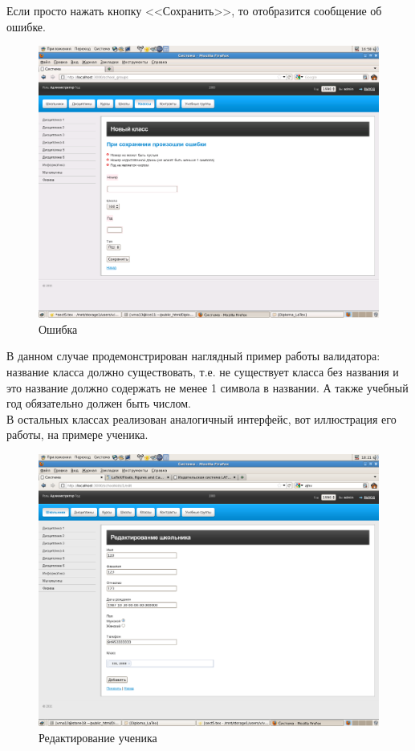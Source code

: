 Если просто нажать кнопку <<Сохранить>>, то отобразится сообщение об ошибке.\\

\begin{figure}
\begin{center}
\includegraphics[scale=0.25]{image/class_error.png}
\caption{Ошибка}
\end{center}
\end{figure}

В данном случае продемонстрирован наглядный пример работы валидатора: название класса должно существовать, т.е. не существует класса без названия и это название должно содержать не менее 1 символа в названии. А также учебный год обязательно должен быть числом.\\
В остальных классах реализован аналогичный интерфейс, вот иллюстрация его работы, на примере ученика.\\

\begin{figure}[ht]
\begin{center}
\includegraphics[scale=0.28]{image/schooler_edit.png}
\caption{Редактирование ученика}
\end{center}
\end{figure}

